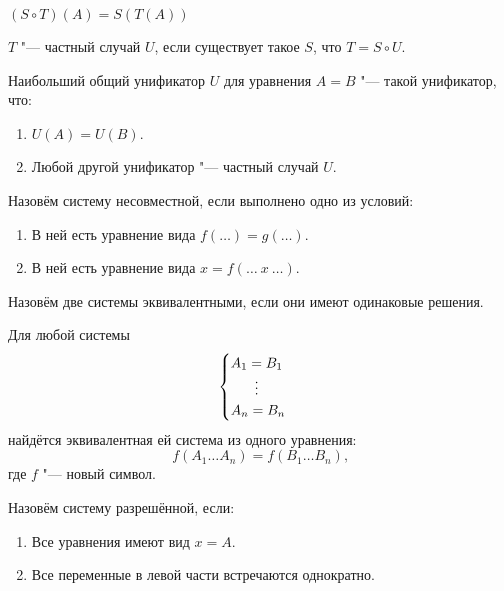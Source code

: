 \begin{definition}[композиция]
    $(S \circ T)(A) = S(T(A))$
\end{definition}

\begin{definition}
    $T$ "--- частный случай $U$, если существует такое $S$, что $T = S \circ U$.
\end{definition}

\begin{definition}
    Наибольший общий унификатор $U$ для уравнения $A=B$ "--- такой унификатор, что:
    \begin{enumerate}
        \item $U(A)=U(B)$.
        \item Любой другой унификатор "--- частный случай $U$.
    \end{enumerate}
\end{definition}

\begin{definition}
    Назовём систему несовместной, если выполнено одно из условий:
    \begin{enumerate}
        \item В ней есть уравнение вида $f(\ldots)=g(\ldots)$.
        \item В ней есть уравнение вида $x = f(\ldots~x~\ldots)$.
    \end{enumerate}
\end{definition}

\begin{definition}
    Назовём две системы эквивалентными, если они имеют одинаковые решения.
\end{definition}

\begin{statement}
    Для любой системы
    \[
        \begin{cases}
            A_1 = B_1 \\
            \phantom{A_1} \mathrel{\makebox[\widthof{=}]{\vdots}} \\
            A_n = B_n
        \end{cases}
    \]
    найдётся эквивалентная ей система из одного уравнения:
    \[
        f(A_1 \ldots A_n) = f(B_1 \ldots B_n)\text{,}
    \]
    где $f$ "--- новый символ.
\end{statement}

\begin{definition}
    Назовём систему разрешённой, если:
    \begin{enumerate}
        \item Все уравнения имеют вид $x = A$.
        \item Все переменные в левой части встречаются однократно.
    \end{enumerate}
\end{definition}

